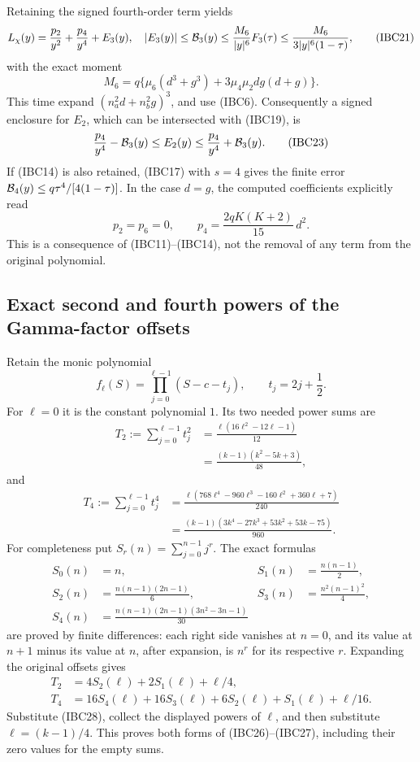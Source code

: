 Retaining the signed fourth-order term yields
\[
 L_\chi(y)=\frac{p_2}{y^2}+\frac{p_4}{y^4}+E_3(y),
 \quad
 |E_3(y)|\leq{\cal B}_3(y)
 \leq\frac{M_6}{|y|^6}F_3(\tau)
 \leq\frac{M_6}{3|y|^6(1-\tau)},
 \tag{IBC21}
\]
with the exact moment
\[
 M_6=q\{\mu_6(d^3+g^3)+3\mu_4\mu_2dg(d+g)\}.
 \tag{IBC22}
\]
This time expand \((n_a^2d+n_b^2g)^3\), and use (IBC6).
Consequently a signed enclosure for \(E_2\), which can be intersected
with (IBC19), is
\[
 \frac{p_4}{y^4}-{\cal B}_3(y)
 \leq E_2(y)\leq
 \frac{p_4}{y^4}+{\cal B}_3(y).
 \tag{IBC23}
\]
If (IBC14) is also retained, (IBC17) with \(s=4\) gives the finite
error \({\cal B}_4(y)\leq q\tau^4/[4(1-\tau)]\).
In the case \(d=g\), the computed coefficients explicitly read
\[
 p_2=p_6=0,\qquad
 p_4=\frac{2qK(K+2)}{15}\,d^2.
 \tag{IBC24}
\]
This is a consequence of (IBC11)--(IBC14), not the removal of any term
from the original polynomial.

\subsection{Exact second and fourth powers of the Gamma-factor offsets}

Retain the monic polynomial
\[
 f_\ell(S)=\prod_{j=0}^{\ell-1}(S-c-t_j),
 \qquad t_j=2j+\frac12.
 \tag{IBC25}
\]
For \(\ell=0\) it is the constant polynomial \(1\).
Its two needed power sums are
\[
 \begin{split}
 T_2:=\sum_{j=0}^{\ell-1}t_j^2
   &=\frac{\ell(16\ell^2-12\ell-1)}{12}\\
   &=\frac{(k-1)(k^2-5k+3)}{48},
 \end{split}
 \tag{IBC26}
\]
and
\[
 \begin{split}
 T_4:=\sum_{j=0}^{\ell-1}t_j^4
   &=\frac{\ell(768\ell^4-960\ell^3-160\ell^2+360\ell+7)}{240}\\
   &=\frac{(k-1)(3k^4-27k^3+53k^2+53k-75)}{960}.
 \end{split}
 \tag{IBC27}
\]
For completeness put \(S_r(n)=\sum_{j=0}^{n-1}j^r\).  The exact formulas
\[
 \begin{split}
 S_0(n)&=n,& S_1(n)&=\frac{n(n-1)}2,\\
 S_2(n)&=\frac{n(n-1)(2n-1)}6,&
 S_3(n)&=\frac{n^2(n-1)^2}{4},\\
 S_4(n)&=\frac{n(n-1)(2n-1)(3n^2-3n-1)}{30}
 \end{split}
 \tag{IBC28}
\]
are proved by finite differences: each right side vanishes at \(n=0\),
and its value at \(n+1\) minus its value at \(n\), after expansion, is
\(n^r\) for its respective \(r\).  Expanding the original offsets gives
\[
 \begin{split}
 T_2&=4S_2(\ell)+2S_1(\ell)+\ell/4,\\
 T_4&=16S_4(\ell)+16S_3(\ell)+6S_2(\ell)+S_1(\ell)+\ell/16.
 \end{split}
 \tag{IBC29}
\]
Substitute (IBC28), collect the displayed powers of \(\ell\), and then
substitute \(\ell=(k-1)/4\).  This proves both forms of
(IBC26)--(IBC27), including their zero values for the empty sums.

